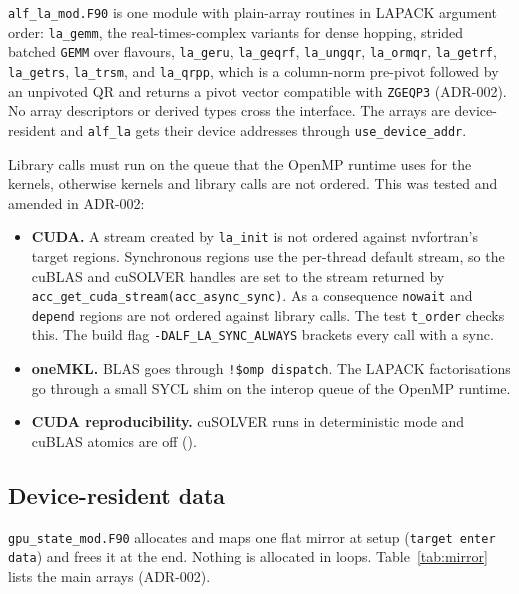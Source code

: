 \texttt{alf\_la\_mod.F90} is one module with plain-array routines in LAPACK argument order: \texttt{la\_gemm}, the real-times-complex variants for dense hopping, strided batched \texttt{GEMM} over flavours, \texttt{la\_geru}, \texttt{la\_geqrf}, \texttt{la\_ungqr}, \texttt{la\_ormqr}, \texttt{la\_getrf}, \texttt{la\_getrs}, \texttt{la\_trsm}, and \texttt{la\_qrpp}, which is a column-norm pre-pivot followed by an unpivoted QR and returns a pivot vector compatible with \texttt{ZGEQP3} (ADR-002). No array descriptors or derived types cross the interface. The arrays are device-resident and \texttt{alf\_la} gets their device addresses through \texttt{use\_device\_addr}.

Library calls must run on the queue that the OpenMP runtime uses for the kernels, otherwise kernels and library calls are not ordered. This was tested and amended in ADR-002:
\begin{itemize}
\item \textbf{CUDA.} A stream created by \texttt{la\_init} is not ordered against nvfortran's target regions. Synchronous regions use the per-thread default stream, so the cuBLAS and cuSOLVER handles are set to the stream returned by \texttt{acc\_get\_cuda\_stream(acc\_async\_sync)}. As a consequence \texttt{nowait} and \texttt{depend} regions are not ordered against library calls. The test \texttt{t\_order} checks this. The build flag \texttt{-DALF\_LA\_SYNC\_ALWAYS} brackets every call with a sync.
\item \textbf{oneMKL.} BLAS goes through \texttt{!\$omp dispatch}. The LAPACK factorisations go through a small SYCL shim on the interop queue of the OpenMP runtime.
\item \textbf{CUDA reproducibility.} cuSOLVER runs in deterministic mode and cuBLAS atomics are off ().
\end{itemize}

\subsection{Device-resident data}

\texttt{gpu\_state\_mod.F90} allocates and maps one flat mirror at setup (\texttt{target enter data}) and frees it at the end. Nothing is allocated in loops. Table~\ref{tab:mirror} lists the main arrays (ADR-002).

